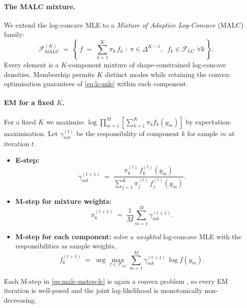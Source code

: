 \paragraph{The MALC mixture.}
We extend the log-concave MLE to a \emph{Mixture of Adaptive Log-Concave}
(MALC) family:
\begin{equation}
\mathcal{F}_{\mathrm{MALC}}^{(K)}
\;=\;
\left\{\, f \;=\; \sum_{k=1}^{K} \pi_k\, f_k
\;:\;
\pi \in \Delta^{K-1},\;\;
f_k \in \mathcal{F}_{\mathrm{LC}}\;
\forall k
\,\right\}.
\label{eq:malc-family}
\end{equation}
Every element is a $K$-component mixture of shape-constrained log-concave
densities. Membership permits $K$ distinct modes while retaining the
convex-optimisation guarantees of \eqref{eq:lc-mle} within each component.

\paragraph{EM for a fixed $K$.}
For a fixed $K$ we maximise
$\log\!\prod_{m=1}^{M}\!\left[\sum_{k=1}^{K}\pi_k f_k(y_m)\right]$
by expectation-maximisation. Let $\gamma_{mk}^{(t)}$ be the responsibility
of component $k$ for sample $m$ at iteration $t$.

\begin{itemize}
\item \textbf{E-step:}
\begin{equation}
\gamma_{mk}^{(t+1)} \;=\; \frac{\pi_k^{(t)}\, f_k^{(t)}(y_m)}
                                {\sum_{j=1}^{K}\pi_j^{(t)}\, f_j^{(t)}(y_m)}.
\label{eq:malc-estep}
\end{equation}
\item \textbf{M-step for mixture weights:}
\begin{equation}
\pi_k^{(t+1)} \;=\; \frac{1}{M}\sum_{m=1}^{M}\gamma_{mk}^{(t+1)}.
\end{equation}
\item \textbf{M-step for each component:} solve a \emph{weighted} log-concave
MLE with the responsibilities as sample weights,
\begin{equation}
f_k^{(t+1)} \;=\; \arg\!\max_{f \in \mathcal{F}_{\mathrm{LC}}}
\sum_{m=1}^{M} \gamma_{mk}^{(t+1)}\,\log f(y_m).
\label{eq:malc-mstep-lc}
\end{equation}
\end{itemize}
Each M-step in \eqref{eq:malc-mstep-lc} is again a convex problem
\citep{cule2010maximum}, so every EM iteration is well-posed and the joint
log-likelihood is monotonically non-decreasing.

